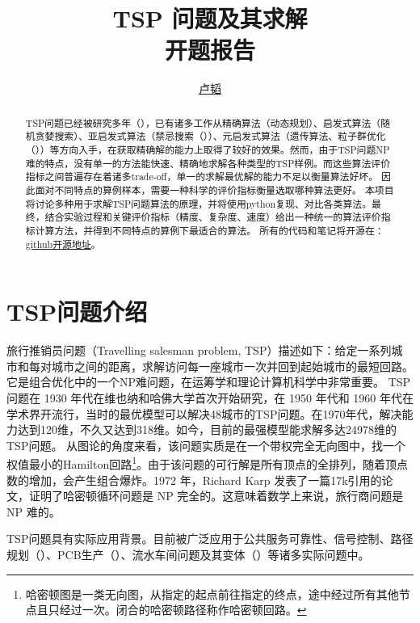 \documentclass[lang=cn,11pt]{elegantpaper}
\title{TSP 问题及其求解\\ {\small 开题报告}}
\author{\href{https://github.com/LT1st/System_engineering_programm/tree/master}{ 卢韬 }}
\institute{自动化1903班 \\20194127}
\begin{document}
\maketitle

\begin{abstract}
\noindent 
\qquad TSP问题已经被研究多年（\cite{tspbookPCB}），已有诸多工作从精确算法（动态规划）、启发式算法（随机贪婪搜索）、亚启发式算法（禁忌搜索（\cite{TSforTSP}））、元启发式算法（遗传算法、粒子群优化（\cite{PSOforTSP}））等方向入手，在获取精确解的能力上取得了较好的效果。然而，由于TSP问题NP难的特点，没有单一的方法能快速、精确地求解各种类型的TSP样例。而这些算法评价指标之间普遍存在着诸多trade-off，单一的求解最优解的能力不足以衡量算法好坏。
因此面对不同特点的算例样本，需要一种科学的评价指标衡量选取哪种算法更好。
本项目将讨论多种用于求解TSP问题算法的原理，并将使用python复现、对比各类算法。最终，结合实验过程和关键评价指标（精度、复杂度、速度）给出一种统一的算法评价指标计算方法，并得到不同特点的算例下最适合的算法。
所有的代码和笔记将开源在：
\href{https://github.com/LT1st/System_engineering_programm/tree/master}{github开源地址}。\par
{}
\end{abstract}

\newpage
\tableofcontents
\newpage

\section{TSP问题介绍}
旅行推销员问题（Travelling salesman problem, TSP）描述如下：给定一系列城市和每对城市之间的距离，求解访问每一座城市一次并回到起始城市的最短回路。
它是组合优化中的一个NP难问题，在运筹学和理论计算机科学中非常重要。
TSP问题在 1930 年代在维也纳和哈佛大学首次开始研究，在 1950 年代和 1960 年代在学术界开流行，当时的最优模型可以解决48城市的TSP问题。在1970年代，解决能力达到120维，不久又达到318维。如今，目前的最强模型能求解多达24978维的TSP问题。
从图论的角度来看，该问题实质是在一个带权完全无向图中，找一个权值最小的Hamilton回路\footnote{哈密顿图是一类无向图，从指定的起点前往指定的终点，途中经过所有其他节点且只经过一次。闭合的哈密顿路径称作哈密顿回路。}。由于该问题的可行解是所有顶点的全排列，随着顶点数的增加，会产生组合爆炸。1972 年，Richard Karp 发表了一篇17k引用的论文\cite{nphard}，证明了哈密顿循环问题是 NP 完全的。这意味着数学上来说，旅行商问题是 NP 难的。


TSP问题具有实际应用背景。目前被广泛应用于公共服务可靠性、信号控制、路径规划（\cite{tspintranspot}）、PCB生产（\cite{tspbookPCB}）、流水车间问题及其变体（\cite{bagchi2006review}）等诸多实际问题中。
\end{document}
